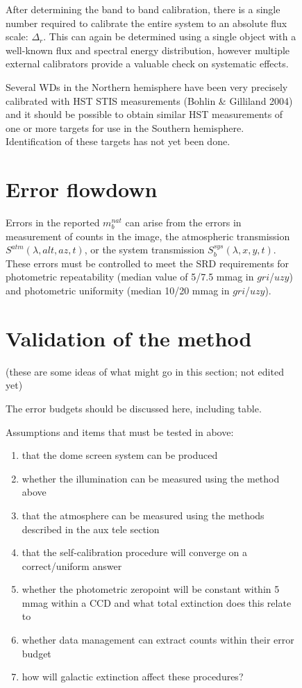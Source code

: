 \documentclass[12pt,preprint]{aastex}
\begin{document}
\begin{figure}[htbp]
{After determining the band to band calibration, there is a single
number required to calibrate the entire system to an absolute flux
scale: $\Delta_r$.  This can again be determined using a single
object with a well-known flux and spectral energy distribution,
however multiple external calibrators provide a valuable check on
systematic effects. 

Several WDs in the Northern hemisphere have been very precisely
calibrated with HST STIS measurements (Bohlin \& Gilliland 2004) and
it should be possible to obtain similar HST measurements of one or
more targets for use in the Southern hemisphere. Identification of
these targets has not yet been done. 

\section{Error flowdown}

Errors in the reported $m_b^{nat}$ can arise from the errors in
measurement of counts in the image, the atmospheric transmission
$S^{atm}(\lambda,alt,az,t)$, or the system transmission
$S_b^{sys}(\lambda,x,y,t)$.  These errors must be controlled to meet
the SRD requirements for photometric repeatability (median value of
5/7.5 mmag in $gri$/$uzy$) and photometric uniformity (median 10/20
mmag in $gri$/$uzy$).





\section{Validation of the method}

(these are some ideas of what might go in this section; not edited yet)

The error budgets should be discussed here, including table.

Assumptions and items that must be tested in above: 
\begin{enumerate}
\item{that the dome screen system can be produced}
\item{whether the illumination can be measured using the method above}
\item{that the atmosphere can be measured using the methods described
    in the aux tele section}
\item{that the self-calibration procedure will converge on a
    correct/uniform answer}
\item{whether the photometric zeropoint will be constant within 5 mmag 
    within a CCD and what total extinction does this relate to}
\item{whether data management can extract counts within their error
    budget}
\item{how will galactic extinction affect these procedures?}
\end{enumerate}

}
\end{figure}
\end{document}
